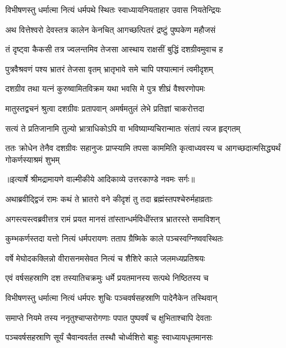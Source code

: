 \twolineshloka
{विभीषणस्तु धर्मात्मा नित्यं धर्मपथे स्थितः}
{स्वाध्यायनियताहार उवास नियतेन्द्रियः} %

\twolineshloka
{अथ वित्तेश्वरो देवस्तत्र कालेन केनचित्}
{आगच्छत्पितरं द्रष्टुं पुष्पकेण महौजसं} %

\twolineshloka
{तं दृष्ट्वा कैकसी तत्र ज्वलन्तमिव तेजसा}
{आस्थाय राक्षसीं बुद्धिं दशग्रीवमुवाच ह} %

\twolineshloka
{पुत्रवैश्रवणं पश्य भ्रातरं तेजसा वृतम्}
{भ्रातृभावे समे चापि पश्यात्मानं त्वमीदृशम्} %

\twolineshloka
{दशग्रीव तथा यत्नं कुरुष्वामितविक्रम}
{यथा भवसि मे पुत्र शीघ्रं वैश्वरणोपमः} %

\twolineshloka
{मातुस्तद्वचनं श्रुत्वा दशग्रीवः प्रतापवान्}
{अमर्षमतुलं लेभे प्रतिज्ञां चाकरोत्तदा} %

\twolineshloka
{सत्यं ते प्रतिजानामि तुल्यो भ्रात्राधिकोऽपि वा}
{भविष्याम्यचिरान्मातः संतापं त्यज हृद्गतम्} %

\threelineshloka
{ततः क्रोधेन तेनैव दशग्रीवः सहानुजः}
{प्राप्स्यामि तपसा काममिति कृत्वाध्यवस्य च}
{आगच्छदात्मसिद्ध्यर्थं गोकर्णस्याश्रमं शुभम्} %


{॥इत्यार्षे श्रीमद्रामायणे वाल्मीकीये आदिकाव्ये उत्तरकाण्डे नवमः सर्गः॥}


\twolineshloka
{अथाब्रवीद्द्विजं रामः कथं ते भ्रातरो वने}
{कीदृशं तु तदा ब्रह्मंस्तपश्चेरुर्महाव्रताः} %

\twolineshloka
{अगस्त्यस्त्वब्रवीत्तत्र रामं प्रयत मानसं}
{तांस्तान्धर्मविधींस्तत्र भ्रातरस्ते समाविशन्} %

\twolineshloka
{कुम्भकर्णस्तदा यत्तो नित्यं धर्मपरायणः}
{तताप ग्रैष्मिके काले पञ्चस्वग्निष्ववस्थितः} %

\twolineshloka
{वर्षे मेघोदकक्लिन्नो वीरासनमसेवत}
{नित्यं च शैशिरे काले जलमध्यप्रतिश्रयः} %

\twolineshloka
{एवं वर्षसहस्राणि दश तस्यातिचक्रमुः}
{धर्मे प्रयतमानस्य सत्पथे निष्ठितस्य च} %

\twolineshloka
{विभीषणस्तु धर्मात्मा नित्यं धर्मपरः शुचिः}
{पञ्चवर्षसहस्राणि पादेनैकेन तस्थिवान्} %

\twolineshloka
{समाप्ते नियमे तस्य ननृतुश्चाप्सरोगणाः}
{पपात पुष्पवर्षं च क्षुभिताश्चापि देवताः} %

\twolineshloka
{पञ्चवर्षसहस्राणि सूर्यं चैवान्ववर्तत}
{तस्थौ चोर्ध्वशिरो बाहुः स्वाध्यायधृतमानसः} %

